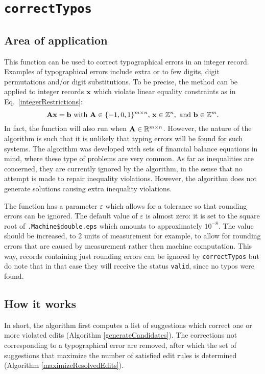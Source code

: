 \documentclass[11pt, fleqn, a4paper]{article}
\begin{document}
%
%
%
\section{\tt correctTypos}
\label{typingErrors}
%
\subsection{Area of application}
This function can be used to correct typographical errors in an integer record.
Examples of typographical errors include extra or to few digits, digit
permutations and/or digit substitutions.  To be precise, the method can be
applied to integer records $\bf x$ which violate linear equality constraints as
in Eq.\ \eqref{integerRestrictions}:
\begin{displaymath}
{\bf Ax} = {\bf b} \textrm{ with } {\bf A}\in \{-1,0,1\}^{m\times n}\textrm{, } {\bf x}\in \mathbb{Z}^{n},\textrm{ and } {\bf b}\in\mathbb{Z}^m.
\end{displaymath}
In fact, the function will also run when ${\bf A}\in \mathbb{R}^{m\times n}$.
However, the nature of the algorithm is such that it is unlikely that typing
errors will be found for such systems.  The algorithm was developed with sets
of financial balance equations in mind, where these type of problems are very
common. As far as inequalities are concerned, they are currently ignored by the
algorithm, in the sense that no attempt is made to repair inequality
violations. However, the algorithm does not generate solutions causing extra
inequality violations.

The function has a parameter $\varepsilon$ which allows for a tolerance so that
rounding errors can be ignored. The default value of $\varepsilon$ is almost
zero: it is set to the square root of {\tt .Machine\$double.eps} which amounts
to approximately $10^{-8}$.  The value should be increased, to 2 units of
measurement for example, to allow for rounding errors that are caused by
measurement rather then machine computation. This way, records containing just
rounding errors can be ignored by {\tt correctTypos} but do note that in that
case they will receive the status {\tt valid}, since no typos were found.

\subsection{How it works}
In short, the algorithm first computes a list of suggestions which correct one
or more violated edits (Algorithm \ref{generateCandidates}). The corrections
not corresponding to a typographical error are removed, after which  the set of
suggestions that maximize the number of satisfied edit rules is determined
(Algorithm \ref{maximizeResolvedEdits}). 
\end{document}
